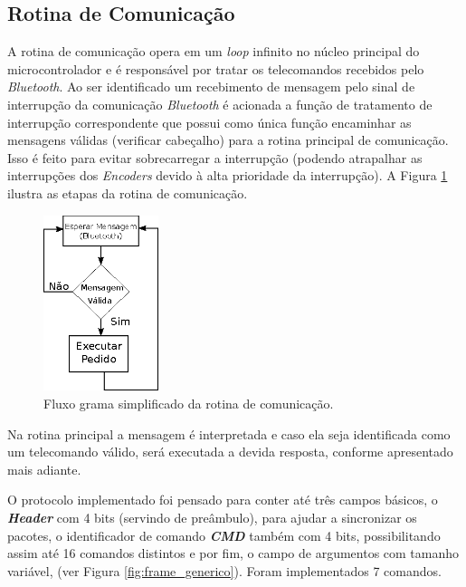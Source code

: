 \subsection{Rotina de Comunicação}
\label{subsec:rotina_comunicacao}
A rotina de comunicação opera em um \emph{loop} infinito no núcleo principal do microcontrolador e é responsável por tratar os telecomandos recebidos pelo \textit{Bluetooth}. Ao ser identificado um recebimento de mensagem pelo sinal de interrupção da comunicação \textit{Bluetooth} é acionada a função de tratamento de interrupção correspondente que possui como única função encaminhar as mensagens válidas (verificar cabeçalho) para a rotina principal de comunicação. Isso é feito para evitar sobrecarregar a interrupção (podendo atrapalhar as interrupções dos \emph{Encoders} devido à alta prioridade da interrupção). A Figura \ref{fig:ilustracao_rotina_comunicacao} ilustra as etapas da rotina de comunicação.\\

\begin{figure}[H]
    \centering
    \includegraphics[width=0.3\textwidth]{figuras/ilustracoes/ilustracao_rotina_de_comunicacao.eps}
    \caption{Fluxo grama simplificado da rotina de comunicação.}
    \label{fig:ilustracao_rotina_comunicacao}
\end{figure}

Na rotina principal a mensagem é interpretada e caso ela seja identificada como um telecomando válido, será executada a devida resposta, conforme apresentado mais adiante.

O protocolo implementado foi pensado para conter até três campos básicos, o \textbf{\textit{Header}} com 4 bits (servindo de preâmbulo), para ajudar a sincronizar os pacotes, o identificador de comando \textbf{\textit{CMD}} também com 4 bits, possibilitando assim até 16 comandos distintos e por fim, o campo de argumentos com tamanho variável, (ver Figura \ref{fig:frame_generico}). Foram implementados 7 comandos.

